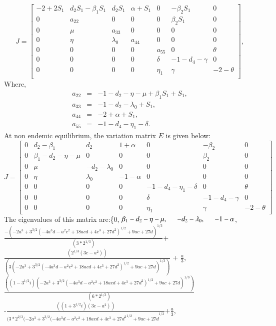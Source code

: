 \[
J=
\begin{bmatrix}
-2+2 S_1&d_2 S_1-\beta_1 S_1&d_2 S_1&\alpha+S_1&0&-\beta_2 S_1&0\\
0&a_{22}&0&0&0&\beta_2 S_1&0\\
0&\mu&a_{33}&0&0&0&0\\
0&\eta&\lambda_0&a_{44}&0&0&0\\
0&0&0&0&a_{55}&0&\theta\\
0&0&0&0&\delta&-1-d_4-\gamma&0\\
0&0&0&0&\eta_1&\gamma&-2-\theta\\
\end{bmatrix},
\]
Where,
\begin{eqnarray*}
a_{22}&=&-1-d_2-\eta-\mu+\beta_1 S_1+S_1, \\
a_{33}&=&-1-d_2-\lambda_0+S_1, \\
a_{44}&=&-2+\alpha+S_1,\\
a_{55}&=&-1-d_4-\eta_1-\delta.
\end{eqnarray*}
\clearpage
At non endemic equilibrium, the variation matrix $E$ is given below:
\[
J=
\begin{bmatrix}
0&d_2-\beta_1&d_2&1+\alpha&0&-\beta_2&0\\
0&\beta_1-d_2-\eta-\mu&0&0&0&\beta_2&0\\
0&\mu&-d_2-\lambda_0&0&0&0&0\\
0&\eta&\lambda_0&-1-\alpha&0&0&0\\
0&0&0&0&-1-d_4-\eta_1-\delta&0&\theta\\
0&0&0&0&\delta&-1-d_4-\gamma&0\\
0&0&0&0&\eta_1&\gamma&-2-\theta
\end{bmatrix}
\]
The eigenvalues of this matrix are:\{0, \hspace{0.5 cm}$ \beta_1-d_2-\eta-\mu, \hspace{0.5 cm} -d_2-\lambda_0, \hspace{0.5 cm} -1-\alpha$,\\
$\frac{ -(-2 a^3 + 3^{3/2} {(-4 a^3 d - a^2 c^2 + 18 a c d + 4 c^3 + 27 d^2)}^{1/2} + 9 a c + 27 d)^{1/3}}{(3*2^{1/3}) }$+\\ $\frac{(2^{1/3} (3 c - a^2))}{(3 (-2 a^3 + 3^{3/2} {(-4 a^3 d - a^2 c^2 + 18 a c d + 4 c^3 + 27 d^2)}^{1/2} + 9 a c + 27 d)^{1/3})}$ + $\frac{a}{3}$,\\
  $\frac{((1 - 3^{1/2} i){ (-2 a^3 + 3^{3/2} {(-4 a^3 d - a^2 c^2 + 18 a c d + 4 c^3 + 27 d^2)}^{1/2} + 9 a c + 27 d)}^{1/3})}{(6* 2^{1/3})}$\\ -$\frac {((1 +3^{1/2} i ) (3 c - a^2))}{{(3* 2^{2/3} (-2 a^3 + 3^{3/2} {(-4 a^3 d - a^2 c^2 + 18 a c d + 4 c^3 + 27 d^2}^{1/2} + 9 a c + 27 d}^{1/3}} $+$\frac{ a}{3}$,\\
